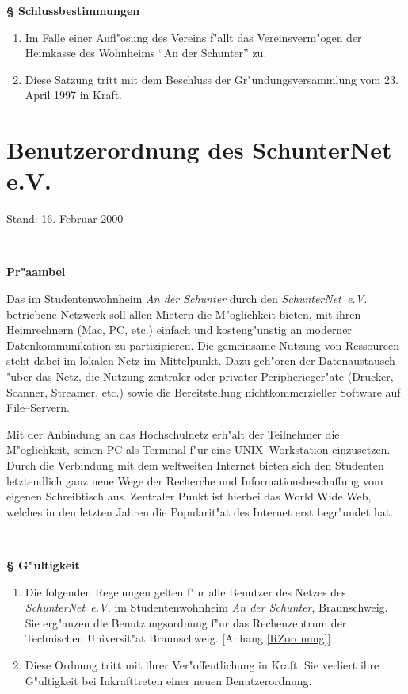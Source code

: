 \documentclass[12pt,titlepage,twoside]{scrartcl}
\newcounter{para_nr}
\newcommand{\Paragraph}[1]{{\large\bf\S{}\sf\textbf{\/\stepcounter{para_nr}\arabic{para_nr} #1}}}
\newcommand{\snev}{\emph{SchunterNet~e.V.} }
\begin{document}
\begin{appendix}
\Paragraph{Schlussbestimmungen}
\begin{enumerate}
\item Im Falle einer Auf\/l"osung des Vereins f"allt das Vereinsverm"ogen der
  Heimkasse des Wohnheims "`An der Schunter"' zu.
\item Diese Satzung tritt mit dem Beschluss der Gr"undungsversammlung vom
  23. April 1997 in Kraft.
\end{enumerate}

\clearpage

\setcounter{para_nr}{0}

\section{Benutzerordnung des SchunterNet e.V.}
\label{nutzerordnung}

{\small Stand: 16. Februar 2000}

\mbox{ }

{\large\sf\textbf{Pr"aambel}}

Das im Studentenwohnheim \emph{An der Schunter} durch den
\snev betriebene Netzwerk soll allen Mietern die
M"oglichkeit bieten, mit ihren Heimrechnern (Mac, PC, etc.) einfach und
kosteng"unstig an moderner Datenkommunikation zu partizipieren. Die
gemeinsame Nutzung von Ressourcen steht dabei im lokalen Netz im
Mittelpunkt. Dazu geh"oren der Datenaustausch "uber das Netz, die
Nutzung zentraler oder privater Peripherieger"ate (Drucker, Scanner,
Streamer, etc.) sowie die Bereitstellung nichtkommerzieller Software
auf File--Servern.

Mit der Anbindung an das Hochschulnetz erh"alt der Teilnehmer die
M"oglichkeit, seinen PC als Terminal f"ur eine UNIX--Workstation
einzusetzen. Durch die Verbindung mit dem weltweiten Internet
bieten sich den Studenten letztendlich ganz neue Wege der Recherche
und Informationsbeschaffung vom eigenen Schreibtisch aus. Zentraler
Punkt ist hierbei das World Wide Web, welches in den letzten Jahren
die Popularit"at des Internet erst begr"undet hat.

\mbox{ }

\Paragraph{G"ultigkeit}

\begin{enumerate}
  \item Die folgenden Regelungen gelten f"ur alle Benutzer des Netzes
      des \snev im Studentenwohnheim \emph{An der Schunter}, Braunschweig. Sie
      erg"anzen die Benutzungsordnung f"ur das Rechenzentrum der Technischen
      Universit"at Braunschweig. [Anhang \ref{RZordnung}]
  \item Diese Ordnung tritt mit ihrer Ver"offentlichung in Kraft. Sie
      verliert ihre G"ultigkeit bei Inkrafttreten einer neuen Benutzerordnung.
\end{enumerate}


\end{appendix}
\end{document}

